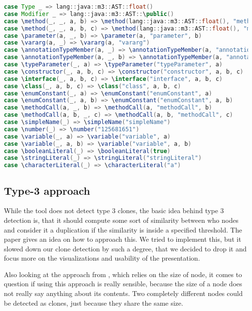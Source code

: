 \documentclass{uva-inf-article}
\begin{document}
\begin{lstlisting}[language=Java, style=mystyle]
case Type _ => lang::java::m3::AST::float()
case Modifier _ => lang::java::m3::AST::\public()
case \method(_, _, a, b) => \method(lang::java::m3::AST::float(), "method", a, b)
case \method(_, _, a, b, c) => \method(lang::java::m3::AST::float(), "method", a, b, c)
case \parameter(a, _, b) => \parameter(a, "parameter", b)
case \vararg(a, _) => \vararg(a, "vararg") 
case \annotationTypeMember(a, _) => \annotationTypeMember(a, "annotationTypeMember")
case \annotationTypeMember(a, _, b) => \annotationTypeMember(a, "annotationTypeMember", b)
case \typeParameter(_, a) => \typeParameter("typeParameter", a)
case \constructor(_, a, b, c) => \constructor("constructor", a, b, c)
case \interface(_, a, b, c) => \interface("interface", a, b, c)
case \class(_, a, b, c) => \class("class", a, b, c)
case \enumConstant(_, a) => \enumConstant("enumConstant", a) 
case \enumConstant(_, a, b) => \enumConstant("enumConstant", a, b)
case \methodCall(a, _, b) => \methodCall(a, "methodCall", b)
case \methodCall(a, b, _, c) => \methodCall(a, b, "methodCall", c)
case \simpleName(_) => \simpleName("simpleName")
case \number(_) => \number("125681651")
case \variable(_, a) => \variable("variable", a) 
case \variable(_, a, b) => \variable("variable", a, b) 
case \booleanLiteral(_) => \booleanLiteral(true)
case \stringLiteral(_) => \stringLiteral("stringLiteral")
case \characterLiteral(_) => \characterLiteral("a")
\end{lstlisting}

\subsection{Type-3 approach}
While the tool does not detect type 3 clones, the basic idea behind type 3 detection is, that it should compute some sort of similarity between who nodes and consider it a duplication if the similarity is inside a specified threshold. The paper \cite{baxter1998clone} gives an idea on how to approach this. We tried to implement this, but it slowed down our clone detection by such a degree, that we decided to drop it and focus more on the visualizations and usability of the presentation. 

Also looking at the approach from \cite{baxter1998clone}, which relies on the size of node, it comes to question if using this approach is really sensible, because the size of a node does not really say anything about its contents. Two completely different nodes could be detected as clones, just because they share the same size.
\end{document}
